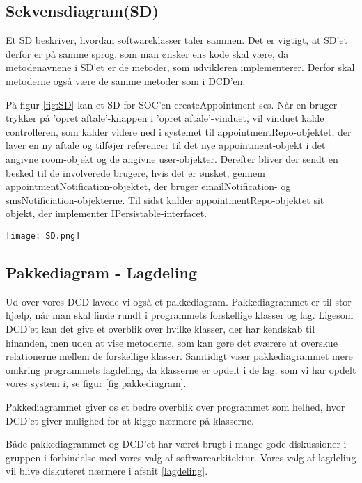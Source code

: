 \subsection{Sekvensdiagram(SD)}
\label{SD}

Et SD beskriver, hvordan softwareklasser taler sammen.
Det er vigtigt, at SD'et derfor er på samme sprog, som man ønsker ens kode skal være, da metodenavnene i SD'et er de metoder, som udvikleren implementerer.
Derfor skal metoderne også være de samme metoder som i DCD'en.

På figur \ref{fig:SD} kan et SD for SOC'en createAppointment ses.
Når en bruger trykker på 'opret aftale'-knappen i 'opret aftale'-vinduet, vil vinduet kalde controlleren, som kalder videre ned i systemet til appointmentRepo-objektet, der laver en ny aftale og tilføjer referencer til det nye appointment-objekt i det angivne room-objekt og de angivne user-objekter.
Derefter bliver der sendt en besked til de involverede brugere, hvis det er ønsket, gennem appointmentNotification-objektet, der bruger emailNotification- og smsNotificiation-objekterne.
Til sidst kalder appointmentRepo-objektet sit objekt, der implementer IPersistable-interfacet.

\begin{sidewaysfigure}
    \caption{SD for SOC Operation - createAppointment}
    \centering
        \texttt{[image: SD.png]}
    \label{fig:SD}
\end{sidewaysfigure}

\subsection{Pakkediagram - Lagdeling}
\label{Pakkediagram}

Ud over vores DCD lavede vi også et pakkediagram.
Pakkediagrammet er til stor hjælp, når man skal finde rundt i programmets forskellige klasser og lag.
Ligesom DCD'et kan det give et overblik over hvilke klasser, der har kendskab til hinanden, men uden at vise metoderne, som kan gøre det sværere at overskue relationerne mellem de forskellige klasser.
Samtidigt viser pakkediagrammet mere omkring programmets lagdeling, da klasserne er opdelt i de lag, som vi har opdelt vores system i, se figur \ref{fig:pakkediagram}.

Pakkediagrammet giver os et bedre overblik over programmet som helhed, hvor DCD'et giver mulighed for at kigge nærmere på klasserne.

Både pakkediagrammet og DCD'et har været brugt i mange gode diskussioner i gruppen i forbindelse med vores valg af softwarearkitektur.
Vores valg af lagdeling vil blive diskuteret nærmere i afsnit \ref{lagdeling}.

